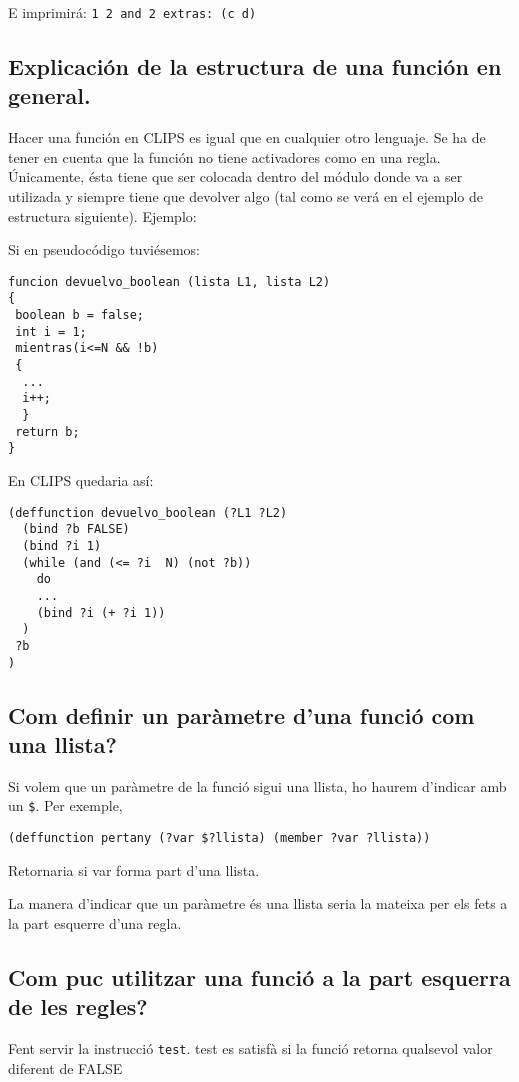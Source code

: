 \documentclass[11pt,svgnames]{scrbook}
\begin{document}
E imprimirá: \texttt{1 2 and 2 extras: (c d)}

\subsection{Explicación de la estructura de una función en general.}

Hacer una función en CLIPS es igual que en cualquier otro lenguaje. Se ha de
tener en cuenta que la función no tiene activadores como en una regla.
Únicamente, ésta tiene que ser colocada dentro del módulo donde va a ser
utilizada y siempre tiene que devolver algo (tal como se verá en el ejemplo de
estructura siguiente).
Ejemplo:

Si en pseudocódigo tuviésemos:

\begin{verbatim}
funcion devuelvo_boolean (lista L1, lista L2)
{
 boolean b = false;
 int i = 1;
 mientras(i<=N && !b)
 {
  ...
  i++;
  }
 return b;
}
\end{verbatim}

En CLIPS quedaria así:
\begin{verbatim}
(deffunction devuelvo_boolean (?L1 ?L2)
  (bind ?b FALSE)
  (bind ?i 1)
  (while (and (<= ?i  N) (not ?b))
    do
    ...
    (bind ?i (+ ?i 1))
  )
 ?b
)
\end{verbatim}

\subsection{Com definir un paràmetre d'una funció com una llista?}


Si volem que un paràmetre de la funció sigui una llista, ho haurem d'indicar amb un \texttt{\$}. Per
exemple,

\begin{verbatim}
(deffunction pertany (?var $?llista) (member ?var ?llista))
\end{verbatim}

Retornaria si var forma part d'una llista.

La manera d'indicar que un paràmetre és una llista seria la mateixa per els fets
a la part esquerre d'una regla.


\subsection{Com puc utilitzar una funció a la part esquerra de les regles?}

Fent servir la instrucció \texttt{test}.
test es satisfà si la funció retorna qualsevol valor diferent de FALSE
\medskip
\end{document}
